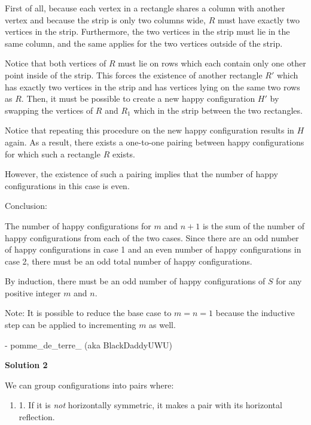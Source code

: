 \begin{enumerate}
 First of all, because each vertex in a rectangle shares a column with another vertex and because the strip is only two columns wide, $R$ must have exactly two vertices in the strip. Furthermore, the two vertices in the strip must lie in the same column, and the same applies for the two vertices outside of the strip.

 Notice that both vertices of $R$ must lie on rows which each contain only one other point inside of the strip. This forces the existence of another rectangle $R'$ which has exactly two vertices in the strip and has vertices lying on the same two rows as $R$. Then, it must be possible to create a new happy configuration $H'$ by swapping the vertices of $R$ and $R_1$ which in the strip between the two rectangles.

 Notice that repeating this procedure on the new happy configuration results in $H$ again. As a result, there exists a one-to-one pairing between happy configurations for which such a rectangle $R$ exists. 

 However, the existence of such a pairing implies that the number of happy configurations in this case is even.

 
Conclusion:

 The number of happy configurations for $m$ and $n+1$ is the sum of the number of happy configurations from each of the two cases. Since there are an odd number of happy configurations in case 1 and an even number of happy configurations in case 2, there must be an odd total number of happy configurations.

 By induction, there must be an odd number of happy configurations of $S$ for any positive integer $m$ and $n$.

 
Note: It is possible to reduce the base case to $m=n=1$ because the inductive step can be applied to incrementing $m$ as well.

 
- pomme\_de\_terre\_ (aka BlackDaddyUWU)

 


 



\textbf{Solution 2}

We can group configurations into pairs where:

 
            \begin{enumerate}[label=(\roman*)]
                \item 1. If it is \textit{not} horizontally symmetric, it makes a pair with its horizontal reflection.
            \end{enumerate}
            

\end{enumerate}
